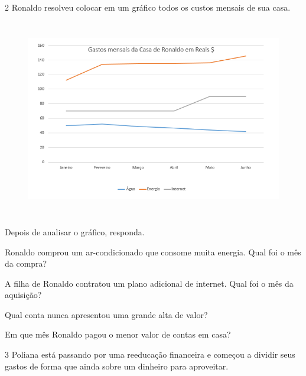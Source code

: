 {{{\begin{escolha}[itemsep=0pt]
\end{escolha}

\num{2} Ronaldo resolveu colocar em um gráfico todos os custos mensais de sua casa.

\begin{figure}[H]
\centering\includegraphics[width=5.30833in,height=3.41384in]{./imgSAEB_8_MAT/media/image40.png}
\end{figure}

Depois de analisar o gráfico, responda.

\begin{escolha}[itemsep=0pt]
\item Ronaldo comprou um ar-condicionado que consome muita energia. Qual foi o mês da compra?


\item A filha de Ronaldo contratou um plano adicional de internet. Qual foi o mês da aquisição?


\item Qual conta nunca apresentou uma grande alta de valor?


\item Em que mês Ronaldo pagou o menor valor de contas em casa?

\end{escolha}


\num{3} Poliana está passando por uma reeducação financeira e começou a
dividir seus gastos de forma que ainda sobre um dinheiro para
aproveitar.

}}}
